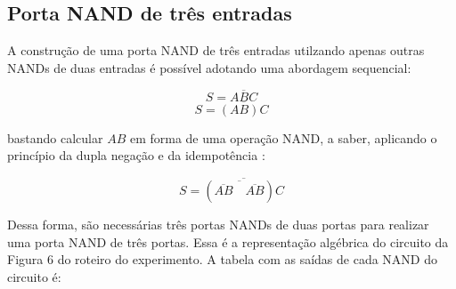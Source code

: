\documentclass[12pt]{article}
\begin{document}
\subsection{Porta NAND de três entradas}
\label{sec:NAND3}


A construção de uma porta NAND de três entradas utilzando apenas outras NANDs de duas entradas
é possível adotando uma abordagem sequencial:

\[S = \overline{ABC}\]
\[S = \overline{(AB)C}\]

\noindent bastando calcular \(AB\) em forma de uma operação NAND, a saber,
aplicando o princípio da dupla negação e da idempotência \cite{wakerly90}:


\begin{equation}
    S = \overline{(\overline{\overline{AB}\quad\overline{AB}})C}
\end{equation}

Dessa forma, são necessárias três portas NANDs de duas portas
para realizar uma porta NAND de três portas. Essa é a representação
algébrica do circuito da Figura 6 do roteiro do experimento. A tabela com as
saídas de cada NAND do circuito é:
\end{document}

